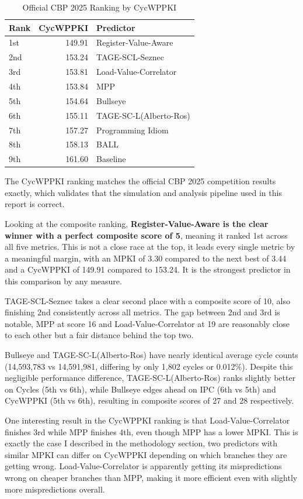\documentclass[11pt,a4paper]{article}
\begin{document}
\begin{table}[H]
\centering
\caption{Official CBP 2025 Ranking by CycWPPKI}
\label{tab:cycwppki_ranking}
\begin{tabular}{lrl}
\toprule
\textbf{Rank} & \textbf{CycWPPKI} & \textbf{Predictor} \\
\midrule
1st & 149.91 & Register-Value-Aware \\
2nd & 153.24 & TAGE-SCL-Seznec \\
3rd & 153.81 & Load-Value-Correlator \\
4th & 153.84 & MPP \\
5th & 154.64 & Bullseye \\
6th & 155.11 & TAGE-SC-L(Alberto-Ros) \\
7th & 157.27 & Programming Idiom \\
8th & 158.13 & BALL \\
9th & 161.60 & Baseline \\
\bottomrule
\end{tabular}
\end{table}

The CycWPPKI ranking matches the official CBP 2025 competition results exactly, 
which validates that the simulation and analysis pipeline used in this report 
is correct.

Looking at the composite ranking, \textbf{Register-Value-Aware is the clear winner with
a perfect composite score of 5}, meaning it ranked 1st across all five metrics. 
This is not a close race at the top, it leads every single metric by a 
meaningful margin, with an MPKI of 3.30 compared to the next best of 3.44 and 
a CycWPPKI of 149.91 compared to 153.24. It is the strongest predictor in this 
comparison by any measure.

TAGE-SCL-Seznec takes a clear second place with a composite score of 10, also
finishing 2nd consistently across all metrics. The gap between 2nd and 3rd is
notable, MPP at score 16 and Load-Value-Correlator at 19 are reasonably
close to each other but a fair distance behind the top two.

Bullseye and TAGE-SC-L(Alberto-Ros) have nearly identical average cycle counts
(14,593,783 vs 14,591,981, differing by only 1,802 cycles or 0.012\%). Despite
this negligible performance difference, TAGE-SC-L(Alberto-Ros) ranks slightly
better on Cycles (5th vs 6th), while Bullseye edges ahead on IPC (6th vs 5th)
and CycWPPKI (5th vs 6th), resulting in composite scores of 27 and 28
respectively.

One interesting result in the CycWPPKI ranking is that Load-Value-Correlator 
finishes 3rd while MPP finishes 4th, even though MPP has a lower MPKI. This is 
exactly the case I described in the methodology section, two predictors with 
similar MPKI can differ on CycWPPKI depending on which branches they are getting 
wrong. Load-Value-Correlator is apparently getting its mispredictions wrong on 
cheaper branches than MPP, making it more efficient even with slightly more 
mispredictions overall.
\end{document}
